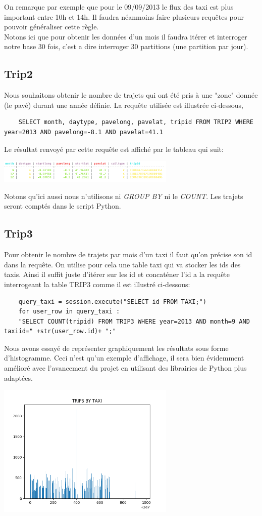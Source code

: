 \documentclass[]{report}
\begin{document}
	On remarque par exemple que pour le 09/09/2013 le flux des taxi est plus important entre 10h et 14h. Il faudra néanmoins faire plusieurs requêtes pour pouvoir généraliser cette règle.\\
	Notons ici que pour obtenir les données d'un mois il faudra itérer et interroger notre base 30 fois, c'est a dire interroger 30 partitions (une partition par jour).
	\subsection{Trip2}
	Nous souhaitons obtenir le nombre de trajets qui ont été pris à une "zone" donnée  (le pavé) durant une année définie. La requête utilisée est illustrée ci-dessous,
	\begin{lstlisting}
	SELECT month, daytype, pavelong, pavelat, tripid FROM TRIP2 WHERE year=2013 AND pavelong=-8.1 AND pavelat=41.1
	\end{lstlisting}
	Le résultat renvoyé par cette requête est affiché par le tableau qui suit:
	\begin{center}
		\includegraphics[width=85mm]{Figures/pave.png}
	\end{center}
	Notons qu'ici aussi nous n'utilisons ni \textit{GROUP BY} ni le \textit{COUNT}. Les trajets seront comptés dans le script Python.
	
	\subsection{Trip3}
	Pour obtenir le nombre de trajets par mois d'un taxi il faut qu'on précise son id dans la requête. On utilise pour cela une table taxi qui va stocker les ids des taxis. Ainsi il suffit juste d'itérer sur les id et concaténer l'id a la requête interrogeant la table TRIP3 comme il est illustré ci-dessous:
	\begin{lstlisting}
	query_taxi = session.execute("SELECT id FROM TAXI;")
	for user_row in query_taxi : 
	"SELECT COUNT(tripid) FROM TRIP3 WHERE year=2013 AND month=9 AND taxiid=" +str(user_row.id)+ ";"  
	\end{lstlisting}
	Nous avons essayé de représenter graphiquement les résultats sous forme d'histogramme. Ceci n'est qu'un exemple d'affichage, il sera bien évidemment amélioré avec l'avancement du projet en utilisant des librairies de Python plus adaptées.
	\begin{center}
		\includegraphics[width=85mm]{Figures/histogram_trip_by_taxi.png}
	\end{center}
\end{document}
